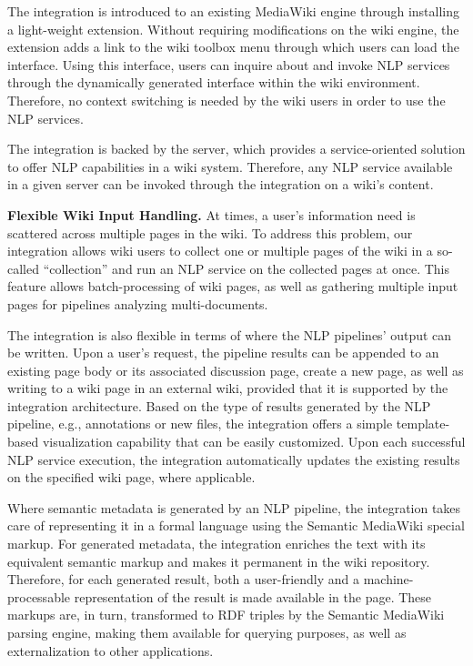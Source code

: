 \begin{description}
\item[Light-weight MediaWiki Extension.] The \wikinlp integration is introduced to an existing MediaWiki engine through installing a light-weight extension. Without requiring modifications on the wiki engine, the extension adds a link to the wiki toolbox menu through which users can load the \wikinlp interface. Using this interface, users can inquire about and invoke NLP services through the dynamically generated \wikinlp interface within the wiki environment. Therefore, no context switching is needed by the wiki users in order to use the NLP services.

\item[NLP Pipeline Independent Architecture.] The \wikinlp integration is backed by the \sa server, which provides a service-oriented solution to offer NLP capabilities in a wiki system. Therefore, any NLP service available in a given \sa server can be invoked through the \wikinlp integration on a wiki's content.
\item\textbf{Flexible Wiki Input Handling.} At times, a user's information need is scattered across multiple pages in the wiki. To address this problem, our \wikinlp integration allows wiki users to collect one or multiple pages of the wiki in a so-called ``collection'' and run an NLP service on the collected pages at once. This feature allows batch-processing of wiki pages, as well as gathering multiple input pages for pipelines analyzing multi-documents.

\item[Flexible NLP Result Handling.] The \wikinlp integration is also flexible in terms of where the NLP pipelines' output can be written. Upon a user's request, the pipeline results can be appended to an existing page body or its associated discussion page, create a new page, as well as writing to a wiki page in an external wiki, provided that it is supported by the \wikinlp integration architecture. Based on the type of results generated by the NLP pipeline, e.g., annotations or new files, the \wikinlp integration offers a simple template-based visualization capability that can be easily customized. Upon each successful NLP service execution, the \wikinlp integration automatically updates the existing results on the specified wiki page, where applicable.

\item[Semantic Markup Generation.] Where semantic metadata is generated by an NLP pipeline, the \wikinlp integration takes care of representing it in a formal language using the Semantic MediaWiki special markup. For generated metadata, the \wikinlp integration enriches the text with its equivalent semantic markup and makes it permanent in the wiki repository. Therefore, for each generated result, both a user-friendly and a machine-processable representation of the result is made available in the page. These markups are, in turn, transformed to RDF triples by the Semantic MediaWiki parsing engine, making them available for querying purposes, as well as externalization to other applications.


\end{description}
